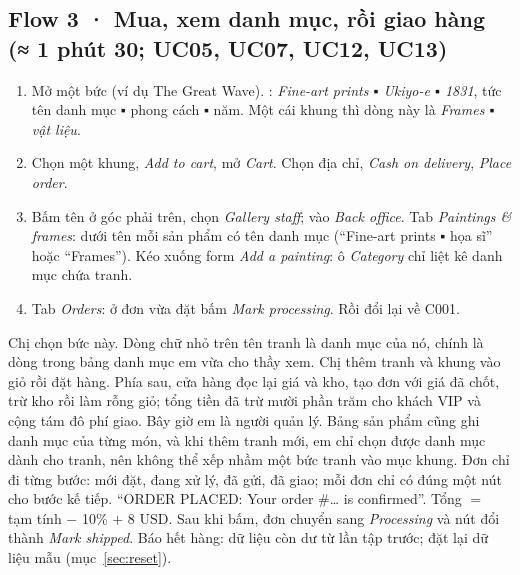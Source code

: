 \subsection{Flow 3 · Mua, xem danh mục, rồi giao hàng \normalfont\small(≈ 1 phút 30; UC05, UC07, UC12, UC13)}
\begin{enumerate}[leftmargin=1.5em]
\item Mở một bức (ví dụ The Great Wave). : \emph{Fine-art prints ▪ Ukiyo-e ▪ 1831}, tức tên danh mục ▪ phong cách ▪ năm. Một cái khung thì dòng này là \emph{Frames ▪ vật liệu}.
\item Chọn một khung, \emph{Add to cart}, mở \emph{Cart}. Chọn địa chỉ, \emph{Cash on delivery}, \emph{Place order}.
\item Bấm tên ở góc phải trên, chọn \emph{Gallery staff}; vào \emph{Back office}. Tab \emph{Paintings \& frames}: dưới tên mỗi sản phẩm có tên danh mục (``Fine-art prints ▪ họa sĩ'' hoặc ``Frames''). Kéo xuống form \emph{Add a painting}: ô \emph{Category} chỉ liệt kê danh mục chứa tranh.
\item Tab \emph{Orders}: ở đơn vừa đặt bấm \emph{Mark processing}. Rồi đổi lại về C001.
\end{enumerate}
Chị chọn bức này. Dòng chữ nhỏ trên tên tranh là danh mục của nó, chính là dòng trong bảng danh mục em vừa cho thầy xem.  Chị thêm tranh và khung vào giỏ rồi đặt hàng. Phía sau, cửa hàng đọc lại giá và kho, tạo đơn với giá đã chốt, trừ kho rồi làm rỗng giỏ; tổng tiền đã trừ mười phần trăm cho khách VIP và cộng tám đô phí giao.  Bây giờ em là người quản lý. Bảng sản phẩm cũng ghi danh mục của từng món, và khi thêm tranh mới, em chỉ chọn được danh mục dành cho tranh, nên không thể xếp nhầm một bức tranh vào mục khung.  Đơn chỉ đi từng bước: mới đặt, đang xử lý, đã gửi, đã giao; mỗi đơn chỉ có đúng một nút cho bước kế tiếp.
``ORDER PLACED: Your order \#\ldots{} is confirmed''. Tổng $=$ tạm tính $-$ 10\% $+$ 8 USD. Sau khi bấm, đơn chuyển sang \emph{Processing} và nút đổi thành \emph{Mark shipped}.
Báo hết hàng: dữ liệu còn dư từ lần tập trước; đặt lại dữ liệu mẫu (mục~\ref{sec:reset}).

